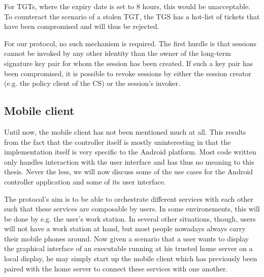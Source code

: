 For TGTs, where the expiry date is set to 8 hours, this would be unacceptable.
To counteract the scenario of a stolen TGT, the TGS has a hot-list of tickets that have been compromised and will thus be rejected.

For our protocol, no such mechanism is required.
The first hurdle is that sessions cannot be invoked by any other identity than the owner of the long-term signature key pair for whom the session has been created.
If such a key pair has been compromised, it is possible to revoke sessions by either the session creator (e.g. the policy client of the CS) or the session's invoker.

\subsection{Mobile client}

Until now, the mobile client has not been mentioned much at all.
This results from the fact that the controller itself is mostly uninteresting in that the implementation itself is very specific to the Android platform.
Most code written only handles interaction with the user interface and has thus no meaning to this thesis.
Never the less, we will now discuss some of the use cases for the Android controller application and some of its user interface.

The protocol's aim is to be able to orchestrate different services with each other such that these services are composable by users.
In some environements, this will be done by e.g. the user's work station.
In several other situations, though, users will not have a work station at hand, but most people nowadays always carry their mobile phones around.
Now given a scenario that a user wants to display the graphical interface of an executable running at his trusted home server on a local display, he may simply start up the mobile client which has previously been paired with the home server to connect these services with one another.

